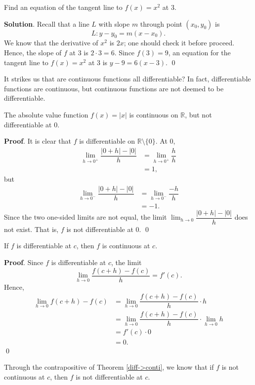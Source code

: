 \documentclass[11pt]{book}
\theoremstyle{break}
\theoremstyle{no_label}
\newcommand{\bbR}{\mathbb{R}}
\numberwithin{equation}{section}
\begin{document}
\begin{example}
    Find an equation of the tangent line to $f(x)=x^2$ at $3$.
\end{example}
\textbf{Solution}. Recall that a line $L$ with slope $m$ through point $(x_0, y_0)$ is $$L:y-y_0=m(x-x_0).$$ We know that the derivative of $x^2$ is $2x$; one should check it before proceed. Hence, the slope of $f$ at $3$ is $2\cdot 3=6$. Since $f(3)=9$, an equation for the tangent line to $f(x)=x^2$ at $3$ is $y-9=6(x-3)$. \qed

It strikes us that are continuous functions all differentiable? In fact, differentiable functions are continuous, but continuous functions are not deemed to be differentiable.

\begin{example}
    The absolute value function $f(x)=|x|$ is continuous on $\bbR$, but not differentiable at $0$.
\end{example}
\textbf{Proof}. It is clear that $f$ is differentiable on $\bbR\setminus\{0\}$. At $0$, \begin{align*}
    \lim_{h\to 0^+}\dfrac{|0+h|-|0|}{h}&=\lim_{h\to 0^+}\dfrac{h}{h}\\
    &=1,
\end{align*} but \begin{align*}
    \lim_{h\to 0^-}\dfrac{|0+h|-|0|}{h}&=\lim_{h\to 0^-}\dfrac{-h}{h}\\
    &=-1.
\end{align*} Since the two one-sided limits are not equal, the limit $\displaystyle\lim_{h\to 0}\dfrac{|0+h|-|0|}{h}$ does not exist. That is, $f$ is not differentiable at $0$. \qed

\begin{theorem}\label{diff->conti}
    If $f$ is differentiable at $c$, then $f$ is continuous at $c$.
\end{theorem}
\textbf{Proof}. Since $f$ is differentiable at $c$, the limit $$\lim_{h\to 0}\dfrac{f(c+h)-f(c)}{h}=f'(c).$$ Hence, \begin{align*}
    \lim_{h\to 0}f(c+h)-f(c)&=\lim_{h\to 0}\dfrac{f(c+h)-f(c)}{h}\cdot h\\
    &=\lim_{h\to 0}\dfrac{f(c+h)-f(c)}{h}\cdot \lim_{h\to 0} h\\
    &=f'(c)\cdot 0\\
    &=0.
\end{align*} \qed

\begin{remark}
    Through the contrapositive of Theorem \ref{diff->conti}, we know that if $f$ is not continuous at $c$, then $f$ is not differentiable at $c$.
\end{remark}
\end{document}

